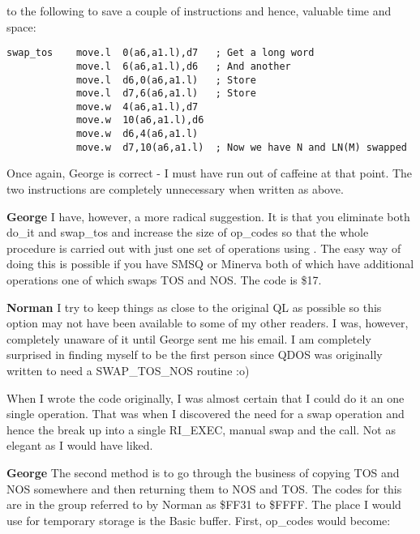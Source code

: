 to the following to save a couple of instructions and hence,
    valuable time and space:

\begin{lstlisting}[firstnumber=93,caption={ANYROOT - Swap\_Tos - Original Code}]
swap_tos    move.l  0(a6,a1.l),d7   ; Get a long word
            move.l  6(a6,a1.l),d6   ; And another
            move.l  d6,0(a6,a1.l)   ; Store
            move.l  d7,6(a6,a1.l)   ; Store
            move.w  4(a6,a1.l),d7
            move.w  10(a6,a1.l),d6
            move.w  d6,4(a6,a1.l)
            move.w  d7,10(a6,a1.l)  ; Now we have N and LN(M) swapped
\end{lstlisting}

Once again, George is correct -{} I must have run out of caffeine at
    that point. The two  instructions are completely unnecessary when
    written as above.

{\bf George} 
I have, however, a more radical
    suggestion. It is that you eliminate both do\_it and swap\_tos and increase
    the size of op\_codes so that the whole procedure is carried out with just
    one set of operations using . The easy way of doing this is
    possible if you have SMSQ or Minerva both of which have additional
    operations one of which swaps TOS and NOS. The code is \$17.



{\bf Norman} 
I try to keep things as close to
    the original QL as possible so this option may not have been available to
    some of my other readers. I was, however, completely unaware of it until
    George sent me his email. I am completely surprised in finding myself to
    be the first person since QDOS was originally written to need a
    SWAP\_TOS\_NOS routine :o)



When I wrote the code originally, I was almost certain that I could
    do it an one single  operation. That was when I discovered the
    need for a swap operation and hence the break up into a single RI\_EXEC,
    manual swap and the  call. Not as elegant as I would have
    liked.

{\bf George} 
The second method is to go
    through the business of copying TOS and NOS somewhere and then returning
    them to NOS and TOS. The codes for this are in the group referred to by
    Norman as \$FF31 to \$FFFF. The place I would use for temporary storage is
    the Basic buffer. First, op\_codes would become:



